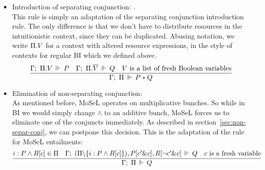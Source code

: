 \begin{itemize}
\item Introduction of separating conjunction: .\\
  This rule is simply an adaptation of the separating conjunction introduction rule.
  The only difference is that we don't have to distribute resources in the intuitionistic context, since they can be duplicated.
  Abusing notation, we write \(\Pi . V\) for a context with altered resource expressions, in the style of contexts for regular BI which we defined above.
  \[
    \infer{\entailsD P * Q}
          {\entails {\IntuD} {\SpatD . V} P &
           \entails {\IntuD} {\SpatD . \overline{V}} Q &
           V \text{ is a list of fresh Boolean variables}}
   \]
 \item Elimination of non-separating conjunction: \\
   As mentioned before, MoSeL operates on multiplicative bunches.
   So while in BI we would simply change \(\wedge\) to an additive bunch, MoSeL forces us to eliminate one of the conjuncts immediately.
   As described in section~\ref{sec:non-separ-conj}, we can postpone this decision.
   This is the adaptation of the rule for MoSeL entailments:
  \[
  \infer{\entailsD Q}
        {i : P \wedge R[c] \in \SpatD &
         \entails {\IntuD}
                  {(\SpatD \backslash \{i : P \wedge R[c]\}), P[c' \& c], R [\neg c' \& c]}
                  {Q} &
         c \text{ is a fresh variable}}
  \]





\end{itemize}
